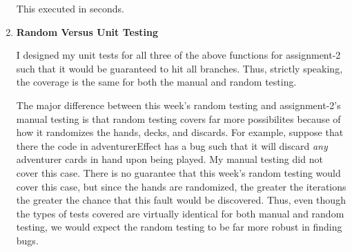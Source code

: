 \documentclass[11pt,letterpaper]{article}
\begin{document}
\begin{enumerate}[label=\arabic*., leftmargin=*]
    This executed in seconds. 

  \item \textbf{Random Versus Unit Testing}

    I designed my unit tests for all three of the above functions for assignment-2 such that
    it would be guaranteed to hit all branches. Thus, strictly speaking, the coverage is
    the same for both the manual and random testing. 

    The major difference between this week's random testing and assignment-2's manual testing
    is that random testing covers far more possibilites because of how it randomizes the hands, 
    decks, and discards. For example, suppose that there the code in adventurerEffect has a 
    bug such that it will discard \emph{any} adventurer cards in hand upon being played. My manual
    testing did not cover this case. There is no guarantee that this week's random testing
    would cover this case, but since the hands are randomized, the greater the iterations
    the greater the chance that this fault would be discovered. Thus, even though the
    types of tests covered are virtually identical for both manual and random testing, we
    would expect the random testing to be far more robust in finding bugs. 

\end{enumerate}
\end{document}
